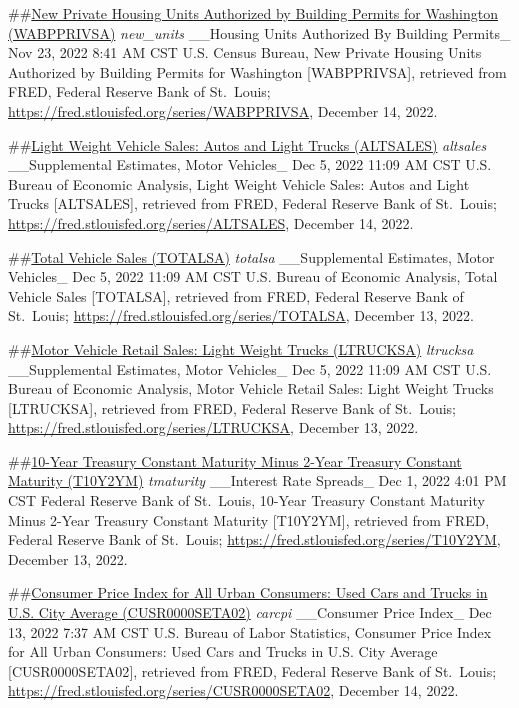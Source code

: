 \documentclass[
]{article}
\begin{document}
\#\#\href{https://fred.stlouisfed.org/series/WABPPRIVSA}{New Private
Housing Units Authorized by Building Permits for Washington
(WABPPRIVSA)} \emph{new\_units} \_\_Housing Units Authorized By Building
Permits\_ Nov 23, 2022 8:41 AM CST U.S. Census Bureau, New Private
Housing Units Authorized by Building Permits for Washington
{[}WABPPRIVSA{]}, retrieved from FRED, Federal Reserve Bank of
St.~Louis; \url{https://fred.stlouisfed.org/series/WABPPRIVSA}, December
14, 2022.

\#\#\href{https://fred.stlouisfed.org/series/ALTSALES}{Light Weight
Vehicle Sales: Autos and Light Trucks (ALTSALES)} \emph{altsales}
\_\_Supplemental Estimates, Motor Vehicles\_ Dec 5, 2022 11:09 AM CST
U.S. Bureau of Economic Analysis, Light Weight Vehicle Sales: Autos and
Light Trucks {[}ALTSALES{]}, retrieved from FRED, Federal Reserve Bank
of St.~Louis; \url{https://fred.stlouisfed.org/series/ALTSALES},
December 14, 2022.

\#\#\href{https://fred.stlouisfed.org/series/TOTALSA}{Total Vehicle
Sales (TOTALSA)} \emph{totalsa} \_\_Supplemental Estimates, Motor
Vehicles\_ Dec 5, 2022 11:09 AM CST U.S. Bureau of Economic Analysis,
Total Vehicle Sales {[}TOTALSA{]}, retrieved from FRED, Federal Reserve
Bank of St.~Louis; \url{https://fred.stlouisfed.org/series/TOTALSA},
December 13, 2022.

\#\#\href{https://fred.stlouisfed.org/series/LTRUCKSA}{Motor Vehicle
Retail Sales: Light Weight Trucks (LTRUCKSA)} \emph{ltrucksa}
\_\_Supplemental Estimates, Motor Vehicles\_ Dec 5, 2022 11:09 AM CST
U.S. Bureau of Economic Analysis, Motor Vehicle Retail Sales: Light
Weight Trucks {[}LTRUCKSA{]}, retrieved from FRED, Federal Reserve Bank
of St.~Louis; \url{https://fred.stlouisfed.org/series/LTRUCKSA},
December 13, 2022.

\#\#\href{https://fred.stlouisfed.org/series/T10Y2YM}{10-Year Treasury
Constant Maturity Minus 2-Year Treasury Constant Maturity (T10Y2YM)}
\emph{tmaturity} \_\_Interest Rate Spreads\_ Dec 1, 2022 4:01 PM CST
Federal Reserve Bank of St.~Louis, 10-Year Treasury Constant Maturity
Minus 2-Year Treasury Constant Maturity {[}T10Y2YM{]}, retrieved from
FRED, Federal Reserve Bank of St.~Louis;
\url{https://fred.stlouisfed.org/series/T10Y2YM}, December 13, 2022.

\#\#\href{https://fred.stlouisfed.org/series/CUSR0000SETA02}{Consumer
Price Index for All Urban Consumers: Used Cars and Trucks in U.S. City
Average (CUSR0000SETA02)} \emph{carcpi} \_\_Consumer Price Index\_ Dec
13, 2022 7:37 AM CST U.S. Bureau of Labor Statistics, Consumer Price
Index for All Urban Consumers: Used Cars and Trucks in U.S. City Average
{[}CUSR0000SETA02{]}, retrieved from FRED, Federal Reserve Bank of
St.~Louis; \url{https://fred.stlouisfed.org/series/CUSR0000SETA02},
December 14, 2022.
\end{document}

